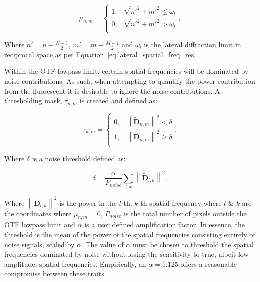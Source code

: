 \begin{equation}\label{eq:circular_mask}
\mu_{n,m} = 
\begin{cases}
1, & \sqrt{n'^{2} + m'^{2}} \le \omega_{l}\\
0, & \sqrt{n'^{2} + m'^{2}} > \omega_{l}\\ 
\end{cases},
\end{equation}

Where $n' = n - \frac{N-1}{2}$, $m' = m - \frac{M-1}{2}$ and $\omega_{l}$ 
is the lateral diffraction limit in reciprocal space as per
 Equation~\ref{eq:lateral_spatial_freq_res} 

Within the OTF lowpass limit, certain spatial frequencies will be dominated
by noise contributions. As such, when attempting to quantify the power 
contribution from the fluorescent it is desirable to ignore the noise
contributions. A thresholding mask, $\tau_{n,m}$ is created and defined as:

\begin{equation}\label{eq:noise_threshold_mask}
\tau_{n,m} = 
\begin{cases}
0, & \left\| \tilde{\textbf{D}}_{n,m} \right\|^2 < \delta\\
1, & \left\| \tilde{\textbf{D}}_{n,m} \right\|^2 \ge \delta\\ 
\end{cases},
\end{equation}

Where $\delta$ is a noise threshold defined as:

\begin{equation}\label{eq:noise_threshold}
\delta = \frac{\alpha}{P_{noise}}\sum\limits_{l,k}{\left\| \tilde{\textbf{D}}_{l,k} \right\|^2},
\end{equation}

Where $\left\| \tilde{\textbf{D}}_{l,k} \right\|^2$ is the power in the 
$l$-th, $k$-th spatial frequency where $l$ \& $k$ are the coordinates 
where $\mu_{n,m} = 0$, $P_{noise}$ is the total number of pixels 
outside the OTF lowpass limit and $\alpha$ is a user defined 
amplification factor. In essence, the threshold is the mean of the
power of the spatial frequencies consisting entirely of noise signals,
scaled by $\alpha$.	The value of $\alpha$ must be chosen to threshold
the spatial frequencies dominated by noise without losing the sensitivity
to true, albeit low amplitude, spatial frequencies. Empirically, an 
$\alpha = 1.125$ offers a reasonable compromise between these traits.


